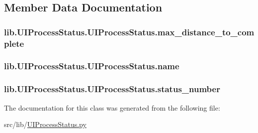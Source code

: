 \subsection{Member Data Documentation}
\hypertarget{classlib_1_1_u_i_process_status_1_1_u_i_process_status_a71b168a9795337f39cd9a043095ca679}{
\subsubsection[{max\-\_\-distance\-\_\-to\-\_\-complete}]{\setlength{\rightskip}{0pt plus 5cm}lib.\-U\-I\-Process\-Status.\-U\-I\-Process\-Status.\-max\-\_\-distance\-\_\-to\-\_\-complete}}\label{classlib_1_1_u_i_process_status_1_1_u_i_process_status_a71b168a9795337f39cd9a043095ca679}
\hypertarget{classlib_1_1_u_i_process_status_1_1_u_i_process_status_ac8e559e5d67a90a74409b0ac97579fa4}{
\subsubsection[{name}]{\setlength{\rightskip}{0pt plus 5cm}lib.\-U\-I\-Process\-Status.\-U\-I\-Process\-Status.\-name}}\label{classlib_1_1_u_i_process_status_1_1_u_i_process_status_ac8e559e5d67a90a74409b0ac97579fa4}
\hypertarget{classlib_1_1_u_i_process_status_1_1_u_i_process_status_a7f891dd871866f2b9c30491b92c4a701}{
\subsubsection[{status\-\_\-number}]{\setlength{\rightskip}{0pt plus 5cm}lib.\-U\-I\-Process\-Status.\-U\-I\-Process\-Status.\-status\-\_\-number}}\label{classlib_1_1_u_i_process_status_1_1_u_i_process_status_a7f891dd871866f2b9c30491b92c4a701}


The documentation for this class was generated from the following file\-:\begin{DoxyCompactItemize}
\item 
src/lib/\hyperlink{_u_i_process_status_8py}{U\-I\-Process\-Status.\-py}\end{DoxyCompactItemize}
